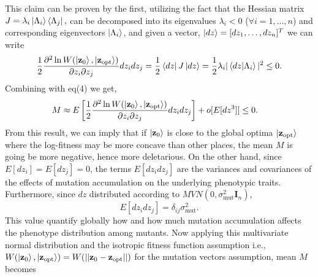 \documentclass[11pt]{article}
\begin{document}
This claim can be proven by the first, utilizing the fact that the Hessian matrix \(    J = \lambda_i \ket{\Lambda_i}\bra{\Lambda_j},
\) can be decomposed into its eigenvalues $\lambda_i<0$ ($\forall i = 1, \hdots, n$) and corresponding eigenvectors $\ket{\Lambda_i}$,
and given a vector,  $\ket{dz} = [dz_1, \hdots, dz_n]^T$ we can write
\begin{align*}
    \frac{1}{2}  \frac{\partial^2 \ln W(\ket{\mathbf{z}_0}, \ket{\mathbf{z}_{\mathrm{opt}}})}{\partial z_i \partial z_j} dz_i dz_j = \frac{1}{2} \bra{dz} J \ket{dz} = \frac{1}{2} \lambda_i |
   \braket{dz}{\Lambda_i}|^2 \leq 0.
\end{align*}
Combining with eq(4) we get,
\begin{align*}
    M &\approx E\left[ \frac{1}{2} \frac{\partial^2 \ln W(\ket{\mathbf{z}_0}, \ket{\mathbf{z}_{\mathrm{opt}}})}{\partial z_i \partial z_j} dz_i dz_j\right] + o[E[dz^3]] \leq 0.
\end{align*}
From this result, we can imply that if $\ket{\mathbf{z}_0}$ is close to the global optima $\ket{\mathbf{z}_{\mathrm{opt}}}$ where the log-fitness may be more concave than other places, the mean $M$ is going be more negative, hence more deletarious.  On the other hand, since \(E[dz_i] = E[dz_j] = 0\), the terms \(E[dz_i dz_j]\) are the variances and covariances of the effects of mutation accumulation on the underlying phenotypic traits. Furthermore, since $dz$ distributed according to $MVN(0, \sigma^2_{\mathrm{mut}} \mathbf{I}_n )$, \[E[dz_i dz_j] = \delta_{ij}\sigma^2_{\mathrm{mut}}.
\] This value quantify globally how and how much mutation accumulation affects the phenotype distribution among mutants. Now applying  this multivariate normal distribution and the isotropic fitness function assumption i.e., $W(\ket{\mathbf{z}_0},\ket{\mathbf{z}_{\mathrm{opt}}}) =  W(||\mathbf{z}_0 - \mathbf{z}_{\mathrm{opt}} ||)$ for the mutation vectors assumption, mean $M$ becomes
\end{document}
